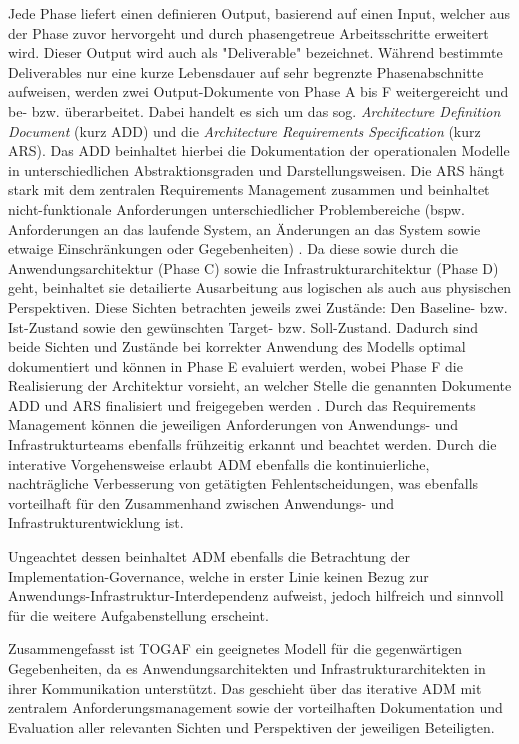 Jede Phase liefert einen definieren Output, basierend auf einen Input, welcher aus der Phase zuvor hervorgeht und durch phasengetreue Arbeitsschritte erweitert wird. Dieser Output wird auch als "Deliverable" bezeichnet. Während bestimmte Deliverables nur eine kurze Lebensdauer auf sehr begrenzte Phasenabschnitte aufweisen, werden zwei Output-Dokumente von Phase A bis F weitergereicht und be- bzw. überarbeitet. Dabei handelt es sich um das sog. \textit{Architecture Definition Document} (kurz ADD) und die \textit{Architecture Requirements Specification} (kurz ARS). Das ADD beinhaltet hierbei die Dokumentation der operationalen Modelle in unterschiedlichen Abstraktionsgraden und Darstellungsweisen. Die ARS hängt stark mit dem zentralen Requirements Management zusammen und beinhaltet nicht-funktionale Anforderungen unterschiedlicher Problembereiche (bspw. Anforderungen an das laufende System, an Änderungen an das System sowie etwaige Einschränkungen oder Gegebenheiten) \cite{Skript}. Da diese sowie durch die Anwendungsarchitektur (Phase C) sowie die Infrastrukturarchitektur (Phase D) geht, beinhaltet sie detailierte Ausarbeitung aus logischen als auch aus physischen Perspektiven. Diese Sichten betrachten jeweils zwei Zustände: Den Baseline- bzw. Ist-Zustand sowie den gewünschten Target- bzw. Soll-Zustand.  Dadurch sind beide Sichten und Zustände bei korrekter Anwendung des Modells optimal dokumentiert und können in Phase E evaluiert werden, wobei Phase F die Realisierung der Architektur vorsieht, an welcher Stelle die genannten Dokumente ADD und ARS finalisiert und freigegeben werden \cite{TOGAFDocs}\cite{VisualParadigmTOGAF}. Durch das Requirements Management können die jeweiligen Anforderungen von Anwendungs- und Infrastrukturteams ebenfalls frühzeitig erkannt und beachtet werden. Durch die interative Vorgehensweise erlaubt ADM ebenfalls die kontinuierliche, nachträgliche Verbesserung von getätigten Fehlentscheidungen, was ebenfalls vorteilhaft für den Zusammenhand zwischen Anwendungs- und Infrastrukturentwicklung ist.

Ungeachtet dessen beinhaltet ADM ebenfalls die Betrachtung der Implementation-Governance, welche in erster Linie keinen Bezug zur Anwendungs-Infrastruktur-Interdependenz aufweist, jedoch hilfreich und sinnvoll für die weitere Aufgabenstellung erscheint.

Zusammengefasst ist TOGAF ein geeignetes Modell für die gegenwärtigen Gegebenheiten, da es Anwendungsarchitekten und Infrastrukturarchitekten in ihrer Kommunikation unterstützt. Das geschieht über das iterative ADM mit zentralem Anforderungsmanagement sowie der vorteilhaften Dokumentation und Evaluation aller relevanten Sichten und Perspektiven der jeweiligen Beteiligten.